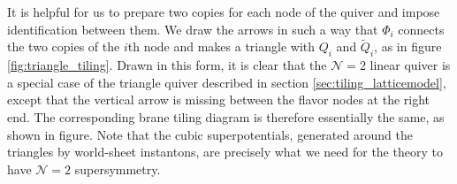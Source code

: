 It is helpful for us to prepare two copies for each node of the quiver
and impose identification between them. We draw the arrows in such
a way that $\Phi_{i}$ connects the two copies of the $i$th node
and makes a triangle with $Q_{i}$ and $\tilde{Q}_{i}$, as in figure \ref{fig:triangle_tiling}.
Drawn in this form, it is clear that the $\mathcal{N}=2$ linear quiver
is a special case of the triangle quiver described in section \ref{sec:tiling_latticemodel},
except that the vertical arrow is missing between the flavor nodes
at the right end. The corresponding brane tiling diagram is therefore
essentially the same, as shown in figure. Note that the cubic superpotentials,
generated around the triangles by world-sheet instantons, are precisely
what we need for the theory to have $\mathcal{N}=2$ supersymmetry.



